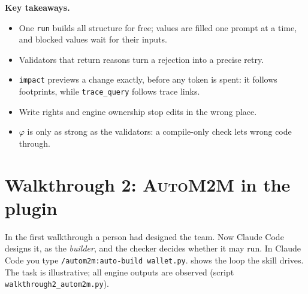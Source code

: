 \documentclass[10pt,a4paper]{article}
\newcommand{\auto}{\textsc{AutoM2M}}
\newcommand{\cc}{Claude Code}
\newcommand{\file}[1]{\texttt{#1}}
\newcommand{\mcptool}[1]{\texttt{#1}}
\newcommand{\skill}[1]{\texttt{/autom2m:#1}}
\newenvironment{takeaway}{%
  \begin{tcolorbox}[enhanced, breakable, colback=keybg, colframe=keybg, arc=0pt, boxrule=0pt,
     borderline west={2.2pt}{0pt}{keybar}, left=8pt, right=8pt, top=5pt, bottom=5pt,
     before skip=8pt, after skip=8pt]
  \textsf{\bfseries\color{keybar}Key takeaways.}\par\smallskip}{\end{tcolorbox}}
\begin{document}
\begin{takeaway}
\begin{itemize}
\item One \mcptool{run} builds all structure for free; values are filled one
prompt at a time, and blocked values wait for their inputs.
\item Validators that return reasons turn a rejection into a precise retry.
\item \mcptool{impact} previews a change exactly, before any token is spent:
it follows footprints, while \mcptool{trace\_query} follows trace links.
\item Write rights and engine ownership stop edits in the wrong place.
\item $\varphi$ is only as strong as the validators: a compile-only check
lets wrong code through.
\end{itemize}
\end{takeaway}

\section{Walkthrough 2: \auto{} in the plugin}\label{sec:walk2}

In the first walkthrough a person had designed the team. Now \cc{} designs
it, as the \emph{builder}, and the checker decides whether it may run. In
\cc{} you type \skill{auto-build wallet.py}.  shows the
loop the skill drives. The task is illustrative; all engine outputs are
observed (script \file{walkthrough2_autom2m.py}).
\end{document}
